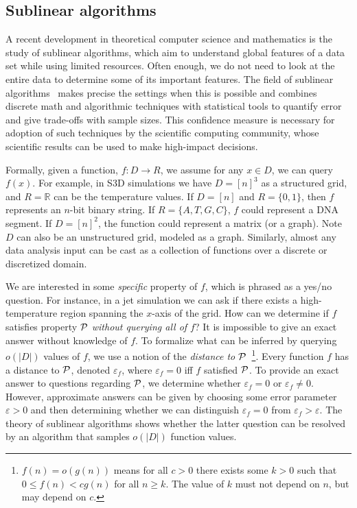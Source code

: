 \documentclass[final]{siamltex}
\newcommand{\cP}{{\cal P}}
\newcommand{\RR}{\mathbb{R}}
\newcommand{\eps}{\varepsilon}
\begin{document}
\subsection{Sublinear algorithms}
A recent development in theoretical computer science and mathematics is the
study of sublinear algorithms,  which aim to understand global features of a data set  while using limited resources. 
Often enough,  we do not need to look at the entire data to determine some of its important features.  The field of sublinear 
algorithms~\cite{FischerSurvey,RonSurvey, RubSurvey} makes precise the settings when this is possible and combines discrete math and algorithmic 
techniques with statistical tools to quantify error and give trade-offs with sample sizes.  This confidence measure is necessary for  adoption 
of such techniques by the scientific computing community, whose scientific results can be used
to make high-impact decisions.

Formally,  given a function, $f:D \rightarrow R$, we assume  for any $x \in D$, we can
query $f(x)$. 
For example, in S3D simulations we have  $D = [n]^3$ as a structured grid, and $R = \RR$ can be  the temperature values. 
If $D = [n]$ and $R = \{0,1\}$, then $f$ represents an $n$-bit binary string. If $R = \{A, T, G, C\}$,
 $f$ could represent a DNA segment. If $D = [n]^2$, the function could represent a matrix (or
a graph). Note $D$  can also be an unstructured grid, modeled as a graph. Similarly, almost any data analysis input can be cast as a 
collection of functions over a discrete or discretized domain.

We are interested in some \emph{specific} property of $f$, which is phrased  as
a yes/no question. For instance, in a jet simulation we can ask  if there  exists a high-temperature region spanning the $x$-axis of the grid. 
How can we determine if $f$ satisfies property $\cP$ \emph{without querying all of $f$}? 
It is impossible to give an exact answer without knowledge of $f$. To formalize what can be inferred
by querying $o(|D|)$ values of $f$, we use a notion of the \emph{distance to
$\cP$}~\footnote{ $f(n) = o(g(n))$ means for all $c > 0$ there exists some $k >
0$ such that $0 \leq f(n) < cg(n)$ for all $n \geq k$. The value of $k$ must not
depend on $n$, but may depend on $c$.}.
Every function $f$ has a distance to $\cP$, denoted $\eps_f$, where $\eps_f = 0$ iff $f$
satisfied $\cP$. To provide an exact answer to questions regarding $\cP$, we determine
whether $\eps_f = 0$ or $\eps_f \neq 0$. However, approximate answers can be given by 
choosing some error parameter $\eps > 0$ and then determining whether we  can distinguish
$\eps_f = 0$ from $\eps_f > \eps$.
The theory of sublinear algorithms shows whether the latter question can be resolved  by an algorithm that samples $o(|D|)$ function values.
\end{document}
